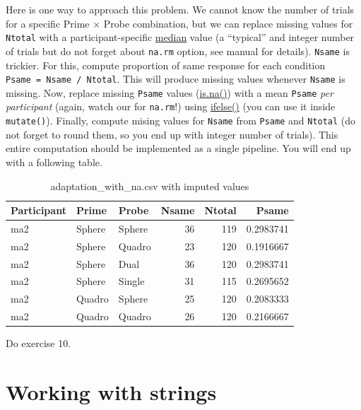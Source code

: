 \documentclass[
]{book}
\begin{document}
Here is one way to approach this problem. We cannot know the number of trials for a specific Prime × Probe combination, but we can replace missing values for \texttt{Ntotal} with a participant-specific \href{https://stat.ethz.ch/R-manual/R-devel/library/stats/html/median.html}{median} value (a ``typical'' and integer number of trials but do not forget about \texttt{na.rm} option, see manual for details). \texttt{Nsame} is trickier. For this, compute proportion of same response for each condition \texttt{Psame\ =\ Nsame\ /\ Ntotal}. This will produce missing values whenever \texttt{Nsame} is missing. Now, replace missing \texttt{Psame} values (\href{https://stat.ethz.ch/R-manual/R-devel/library/base/html/NA.html}{is.na()}) with a mean \texttt{Psame} \emph{per participant} (again, watch our for \texttt{na.rm}!) using \href{https://stat.ethz.ch/R-manual/R-devel/library/base/html/ifelse.html}{ifelse()} (you can use it inside \texttt{mutate()}). Finally, compute mising values for \texttt{Nsame} from \texttt{Psame} and \texttt{Ntotal} (do not forget to round them, so you end up with integer number of trials). This entire computation should be implemented as a single pipeline. You will end up with a following table.

\begin{table}

\caption{\label{tab:unnamed-chunk-291}adaptation\_with\_na.csv with imputed values}
\centering
\begin{tabular}[t]{l|l|l|r|r|r}
\hline
Participant & Prime & Probe & Nsame & Ntotal & Psame\\
\hline
ma2 & Sphere & Sphere & 36 & 119 & 0.2983741\\
\hline
ma2 & Sphere & Quadro & 23 & 120 & 0.1916667\\
\hline
ma2 & Sphere & Dual & 36 & 120 & 0.2983741\\
\hline
ma2 & Sphere & Single & 31 & 115 & 0.2695652\\
\hline
ma2 & Quadro & Sphere & 25 & 120 & 0.2083333\\
\hline
ma2 & Quadro & Quadro & 26 & 120 & 0.2166667\\
\hline
\end{tabular}
\end{table}

Do exercise 10.

\hypertarget{strings}{%
\chapter{Working with strings}\label{strings}}
\end{document}
